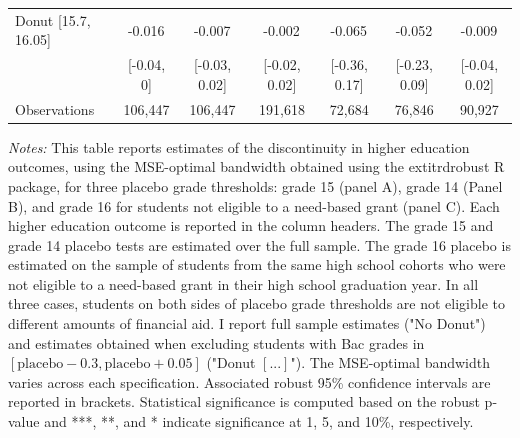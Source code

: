\begin{table}[H]
{\begin{threeparttable}
\begin{tabular}[t]{lcccccc}
\hspace{1em}Donut [15.7, 16.05] & -0.016$^{}$ & -0.007$^{}$ & -0.002$^{}$ & -0.065$^{}$ & -0.052$^{}$ & -0.009$^{}$\\
\hspace{1em} & {}[-0.04, 0] & {}[-0.03, 0.02] & {}[-0.02, 0.02] & {}[-0.36, 0.17] & {}[-0.23, 0.09] & {}[-0.04, 0.02]\\
\hspace{1em}Observations & 106,447 & 106,447 & 191,618 & 72,684 & 76,846 & 90,927\\
\bottomrule
\end{tabular}
\begin{tablenotes}
\item \textit{Notes:} This table reports estimates of the discontinuity in higher education outcomes, using the MSE-optimal bandwidth obtained using the 	extit{rdrobust} R package, for three placebo grade thresholds: grade 15 (panel A), grade 14 (Panel B), and grade 16 for students not eligible to a need-based grant (panel C). Each higher education outcome is reported in the column headers. The grade 15 and grade 14 placebo tests are estimated over the full sample. The grade 16 placebo is estimated on the sample of students from the same high school cohorts who were not eligible to a need-based grant in their high school graduation year. In all three cases, students on both sides of placebo grade thresholds are not eligible to different amounts of financial aid. I report full sample estimates ("No Donut") and estimates obtained when excluding students with Bac grades in $[\text{placebo} - 0.3, \text{placebo} + 0.05]$ ("Donut $[...]$"). The MSE-optimal bandwidth varies across each specification. Associated robust 95\% confidence intervals are reported in brackets. Statistical significance is computed based on the robust p-value and ***, **, and * indicate significance at 1, 5, and 10\%, respectively.
\end{tablenotes}
\end{threeparttable}}
\end{table}
